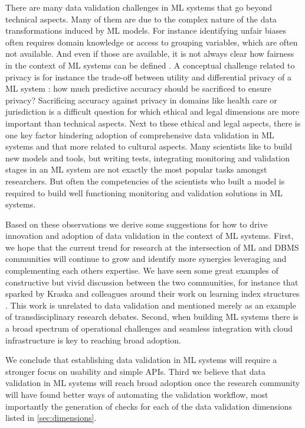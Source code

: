 There are many data validation challenges in ML systems that go beyond technical aspects. Many of them are due to the complex nature of the data transformations induced by ML models. For instance identifying unfair biases often requires domain knowledge or access to grouping variables, which are often not available. And even if those are available, it is not always clear how fairness in the context of ML systems can be defined  \cite{Zhang2020}. A conceptual challenge related to privacy is for instance the trade-off between utility and differential privacy of a ML system \cite{Jayaraman2019}: how much predictive accuracy should be sacrificed to ensure privacy? Sacrificing accuracy against privacy in domains like health care or jurisdiction is a difficult question for which ethical and legal dimensions are more important than technical aspects. Next to these ethical and legal aspects, there is one key factor hindering adoption of comprehensive data validation in ML systems and that more related to cultural aspects. Many scientists like to build new models and tools, but writing tests, integrating monitoring and validation stages in an ML system are not exactly the most popular tasks amongst researchers. But often the competencies of the scientists who built a model is required to build well functioning monitoring and validation solutions in ML systems. 

Based on these observations we derive some suggestions for how to drive innovation and adoption of data validation in the context of ML systems. First, we hope that the current trend for research at the intersection of ML and DBMS communities will continue to grow and identify more synergies leveraging and complementing each others expertise. We have seen some great examples of constructive but vivid discussion between the two communities, for instance that sparked by Kraska and colleagues around their work on learning index structures \cite{Kraska2018}. This work is unrelated to data validation and mentioned merely as an example of transdisciplinary research debates. 
Second, when building ML systems there is a broad spectrum of operational challenges and seamless integration with cloud infrastructure is key to reaching broad adoption. 

\newpage
We conclude that establishing data validation in ML systems will require a stronger focus on usability and simple APIs. Third we believe that data validation in ML systems will reach broad adoption once the research community will have found better ways of automating the validation workflow, most importantly the generation of checks for each of the data validation dimensions listed in \autoref{sec:dimensions}. 

